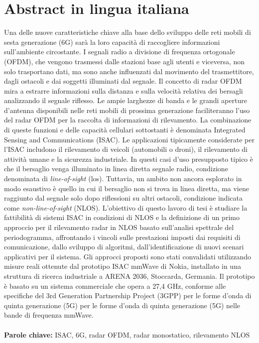 \documentclass{Configuration_Files/PoliMi3i_thesis}
\begin{document}
\chapter*{Abstract in lingua italiana}
Una delle nuove caratteristiche chiave alla base dello sviluppo delle reti mobili di sesta generazione (6G) sarà la loro capacità di raccogliere informazioni sull'ambiente circostante. 
I segnali radio a divisione di frequenza ortogonale (OFDM), che vengono trasmessi dalle stazioni base agli utenti e viceversa, non solo trasportano dati, ma sono anche influenzati dal movimento del trasmettitore, dagli ostacoli e dai soggetti illuminati dal segnale.
Il concetto di radar OFDM mira a estrarre informazioni sulla distanza e sulla velocità relativa dei bersagli analizzando il segnale riflesso.
Le ampie larghezze di banda e le grandi aperture d'antenna disponibili nelle reti mobili di prossima generazione faciliteranno l'uso del radar OFDM per la raccolta di informazioni di rilevamento. 
La combinazione di queste funzioni e delle capacità cellulari sottostanti è denominata Integrated Sensing and Communications (ISAC). 
Le applicazioni tipicamente considerate per l'ISAC includono il rilevamento di veicoli (automobili o droni), il rilevamento di attività umane e la sicurezza industriale. 
In questi casi d'uso presupposto tipico è che il bersaglio venga illuminato in linea diretta segnale radio, condizione denominata di \textit{line-of-sight} (\gls{los}). Tuttavia, un ambito non ancora esplorato in modo esaustivo è quello in cui il bersaglio non si trova in linea diretta, ma viene raggiunto dal segnale solo dopo riflessioni su altri ostacoli, condizione indicata come \textit{non-line-of-sight} (NLOS).
L'obiettivo di questo lavoro di tesi è studiare la fattibilità di sistemi ISAC in condizioni di NLOS e la definizione di un primo approccio per il rilevamento radar in NLOS basato sull'analisi spettrale del periodogramma, affrontando i vincoli sulle prestazioni imposti dai requisiti di comunicazione, dallo sviluppo di algoritmi, dall'identificazione di nuovi scenari applicativi per il sistema.
Gli approcci proposti sono stati convalidati utilizzando misure reali
ottenute dal prototipo ISAC mmWave di Nokia, installato in
una struttura di ricerca industriale a ARENA 2036, Stoccarda, Germania. 
Il prototipo è basato su un sistema commerciale che opera a 27,4 GHz, conforme alle specifiche del 3rd Generation Partnership Project (3GPP) per le forme d'onda di quinta generazione (5G) per le forme d'onda di quinta generazione (5G) nelle bande di frequenza mmWave. 
\\
\\
\textbf{Parole chiave:} ISAC, 6G, radar OFDM, radar monostatico, rilevamento NLOS %
\end{document}
